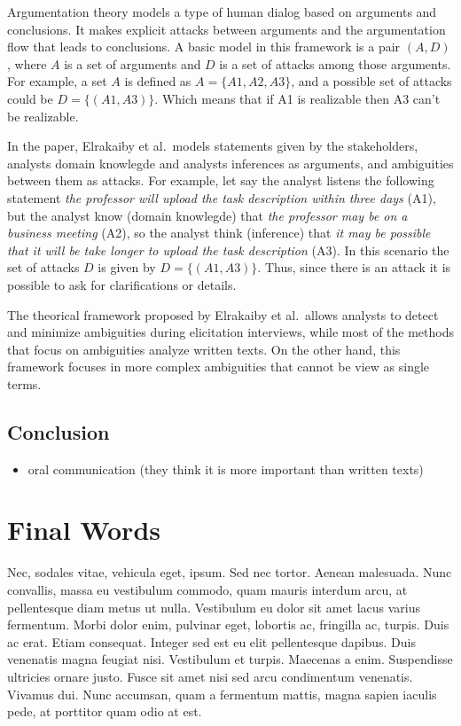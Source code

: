 \documentclass[]{llncs}
\begin{document}
Argumentation theory models a type of human dialog based on arguments
and conclusions. It makes explicit attacks between arguments and the
argumentation flow that leads to conclusions. A basic model in this
framework is a pair \((A,D)\), where \(A\) is a set of arguments and
\(D\) is a set of attacks among those arguments. For example, a set
\(A\) is defined as \(A = \{A1,A2,A3\}\), and a possible set of attacks
could be \(D = \{(A1,A3)\}\). Which means that if A1 is realizable then
A3 can't be realizable.

In the paper, Elrakaiby et al.~models statements given by the
stakeholders, analysts domain knowlegde and analysts inferences as
arguments, and ambiguities between them as attacks. For example, let say
the analyst listens the following statement \emph{the professor will
upload the task description within three days} (A1), but the analyst
know (domain knowlegde) that \emph{the professor may be on a business
meeting} (A2), so the analyst think (inference) that \emph{it may be
possible that it will be take longer to upload the task description}
(A3). In this scenario the set of attacks \(D\) is given by
\(D = \{(A1,A3)\}\). Thus, since there is an attack it is possible to
ask for clarifications or details.

The theorical framework proposed by Elrakaiby et al.~allows analysts to
detect and minimize ambiguities during elicitation interviews, while
most of the methods that focus on ambiguities analyze written texts. On
the other hand, this framework focuses in more complex ambiguities that
cannot be view as single terms.

\hypertarget{conclusion}{%
\subsection{Conclusion}\label{conclusion}}

\begin{itemize}
\tightlist
\item
  oral communication (they think it is more important than written
  texts)
\end{itemize}

\hypertarget{final-words}{%
\section{Final Words}\label{final-words}}

Nec, sodales vitae, vehicula eget, ipsum. Sed nec tortor. Aenean
malesuada. Nunc convallis, massa eu vestibulum commodo, quam mauris
interdum arcu, at pellentesque diam metus ut nulla. Vestibulum eu dolor
sit amet lacus varius fermentum. Morbi dolor enim, pulvinar eget,
lobortis ac, fringilla ac, turpis. Duis ac erat. Etiam consequat.
Integer sed est eu elit pellentesque dapibus. Duis venenatis magna
feugiat nisi. Vestibulum et turpis. Maecenas a enim. Suspendisse
ultricies ornare justo. Fusce sit amet nisi sed arcu condimentum
venenatis. Vivamus dui. Nunc accumsan, quam a fermentum mattis, magna
sapien iaculis pede, at porttitor quam odio at est.
\end{document}
